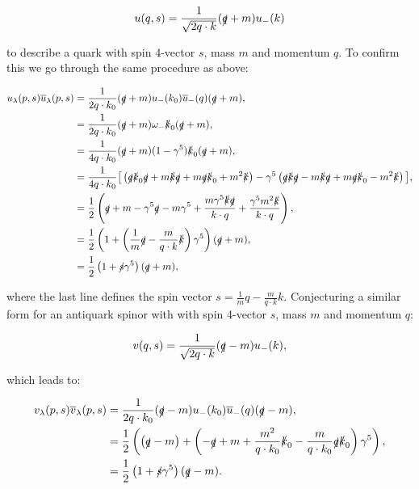 		\begin{equation}
			\label{u_def}
			u(q, s) = \frac{1}{\sqrt{2q\cdot k}}(\slashed q + m)u_-(k)
		\end{equation}

		to describe a quark with spin 4-vector $s$, mass $m$ and momentum $q$.  To confirm this we go through the same procedure as above:

		\begin{subequations}
		\begin{align*}
			u_\lambda(p,s)\overline{u}_\lambda(p,s) &= \frac{1}{2q\cdot k_0}(\slashed q + m) u_-(k_0)\overline{u}_-(q)(\slashed q + m),\\
			&= \frac{1}{2q\cdot k_0}(\slashed q + m) \omega_-\slashed k_0 (\slashed q + m), \\
			&= \frac{1}{4q\cdot k_0}(\slashed q + m) (1-\gamma^{5})\slashed k_0 (\slashed q + m), \\
			&= \frac{1}{4q\cdot k_0}\big[\left(\slashed q \slashed k_0 \slashed q + m\slashed k\slashed q + m\slashed q \slashed
			k_0 + m^2 \slashed k\right)-\gamma^{5}\left(\slashed q\slashed k\slashed q - m\slashed k\slashed q + m\slashed q\slashed k_0 - m^2\slashed k\right)\big], \\
			&= \frac{1}{2}\left(\slashed q + m - \gamma^{5}\slashed q - m\gamma^{5} + \frac{m\gamma^{5}\slashed k\slashed q}{k\cdot q} + \frac{\gamma^{5}m^2\slashed k}{k\cdot q}\right),\\
			&= \frac{1}{2}\left(1+\left(\frac{1}{m}\slashed q - \frac{m}{q\cdot k}\slashed k\right)\gamma^{5}\right)(\slashed q + m),\\
			&= \frac{1}{2}\left(1+\slashed s\gamma^{5}\right)(\slashed q + m),\\
		\end{align*}
		\end{subequations}

		where the last line defines the spin vector $s = \frac{1}{m} q - \frac{m}{q\cdot k}k$.  Conjecturing
		a similar form for an antiquark spinor with with spin 4-vector $s$, mass $m$ and momentum $q$:

		\begin{equation}
			\label{v_def}
			v(q, s) = \frac{1}{\sqrt{2q\cdot k}}(\slashed q - m)u_-(k),
		\end{equation}

		which leads to:

		\begin{subequations}
		\begin{align*}
			v_\lambda(p,s)\overline{v}_\lambda(p,s) &= \frac{1}{2q\cdot k_0}(\slashed q - m) u_-(k_0)\overline{u}_-(q)(\slashed q - m),\\
			&= \frac{1}{2}\left(\left(\slashed q - m\right) + \left(-\slashed q + m + \frac{m^2}{q\cdot k_0}\slashed k_0 -
			\frac{m}{q\cdot k_0}\slashed q\slashed k_0 \right)\gamma^{5}\right), \\
			&= \frac{1}{2}\left(1+\slashed s\gamma^{5}\right)(\slashed q - m).\\
		\end{align*}
		\end{subequations}

